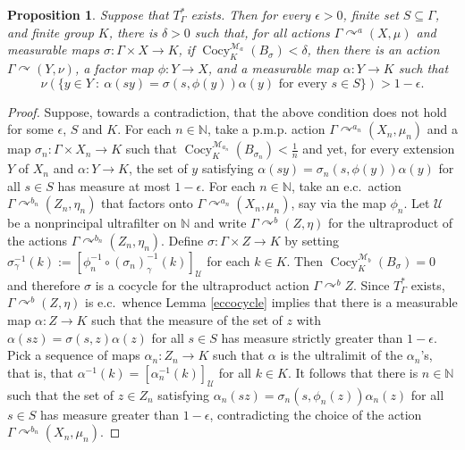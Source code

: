 \documentclass[12pt]{amsart}
\newtheorem{prop}[thm]{Proposition}
\theoremstyle{definition}
\def\bb{\mathbb}
\def\bb{\mathbb}
\def\cal{\mathcal}
\def\u{\mathsf 1}
\def \u{\mathcal U}
\def\Cocy{\operatorname{Cocy}}
\newcommand{\pmp}{p{$.$}m{$.$}p{$.$}}
\newcommand{\acts}{\curvearrowright}
\begin{document}
\begin{prop} \label{prop:mc_cocycle}
Suppose that $T_\Gamma^*$ exists.  Then for every $\epsilon>0$, finite set $S \subseteq \Gamma$, and finite group $K$, there is $\delta>0$ such that, for all actions $\Gamma\acts^a(X,\mu)$ and measurable maps $\sigma:\Gamma\times X\to K$, if $\Cocy_K^{\cal M_a}(B_\sigma)<\delta$, then there is an action $\Gamma\acts (Y,\nu)$, a factor map $\phi:Y\to X$, and a measurable map $\alpha:Y\to K$ such that $$\nu(\{y\in Y \ : \ \alpha(s y) = \sigma(s, \phi(y)) \alpha(y) \text{ for every $s \in S$}\})>1-\epsilon.$$
\end{prop}

\begin{proof}
Suppose, towards a contradiction, that the above condition does not hold for some $\epsilon$, $S$ and $K$.  For each $n\in \bb N$, take a {\pmp} action $\Gamma \acts^{a_n} (X_n, \mu_n)$ and a map $\sigma_n : \Gamma \times X_n \rightarrow K$ such that $\Cocy^{\cal M_{a_n}}_K(B_{\sigma_n})<\frac{1}{n}$ and yet, for every extension $Y$ of $X_n$ and $\alpha : Y \rightarrow K$, the set of $y$ satisfying $\alpha(s y) = \sigma_n(s, \phi(y)) \alpha(y)$ for all $s\in S$ has measure at most $1-\epsilon$. For each $n\in \bb N$, take an e.c.\ action $\Gamma \acts^{b_n} (Z_n, \eta_n)$ that factors onto $\Gamma \acts^{a_n} (X_n, \mu_n)$, say via the map $\phi_n$. Let $\u$ be a nonprincipal ultrafilter on $\bb N$ and write $\Gamma\acts^b(Z, \eta)$ for the ultraproduct of the actions $\Gamma\acts^{b_n}(Z_n,\eta_n)$.  Define $\sigma : \Gamma \times Z \rightarrow K$ by setting $\sigma_\gamma^{-1}(k):=[\phi_n^{-1} \circ (\sigma_n)_\gamma^{-1}(k)]_\u$ for each $k\in K$.  Then $\Cocy^{\cal M_b}_K(B_\sigma) = 0$ and therefore $\sigma$ is a cocycle for the ultraproduct action $\Gamma\acts^b Z$.  Since $T_\Gamma^*$ exists, $\Gamma \acts^b (Z, \eta)$ is e.c.\, whence Lemma \ref{eccocycle} implies that there is a measurable map $\alpha : Z \rightarrow K$ such that the measure of the set of $z$ with $\alpha(s z) = \sigma(s, z) \alpha(z)$ for all $s \in S$ has measure strictly greater than $1-\epsilon$. Pick a sequence of maps $\alpha_n : Z_n \rightarrow K$ such that $\alpha$ is the ultralimit of the $\alpha_n$'s, that is, that $\alpha^{-1}(k)=[\alpha_n^{-1}(k)]_\u$ for all $k\in K$.  It follows that there is $n\in \bb N$ such that the set of $z\in Z_n$ satisfying $\alpha_n(s z) = \sigma_n(s, \phi_n(z)) \alpha_n(z)$ for all $s \in S$ has measure greater than $1-\epsilon$, contradicting the choice of the action $\Gamma\acts^{b_n} (X_n,\mu_n)$.
\end{proof}
\end{document}

